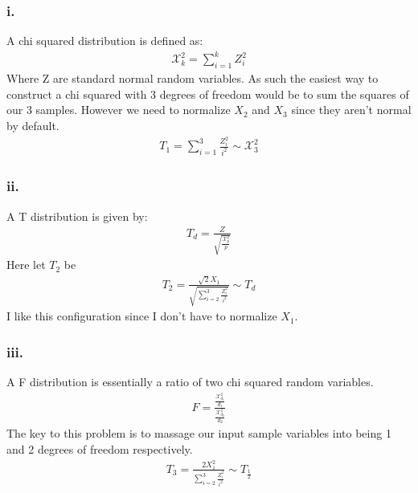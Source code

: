 \documentclass{article}
\begin{document}
\subsubsection*{i.}
A chi squared distribution is defined as:
\begin{align*}
\mathcal{X}^{2}_{k} = \sum_{i=1}^{k} Z^2_i
\end{align*}
Where Z are standard normal random variables. As such the easiest way to construct a chi squared with 3 degrees of freedom would be to sum the squares of our 3 samples. However we need to normalize $X_2$ and $X_3$ since they aren't normal by default.
\begin{align*}
\boxed{ T_1 = \sum_{i=1}^{3} \frac{Z^2_i}{i^2} \sim \mathcal{X}^{2}_{3} }
\end{align*}
\subsubsection*{ii.}
A T distribution is given by:
\begin{align*}
T_d = \frac{Z}{\sqrt{\tfrac{\mathcal{X}_p^2}{p}}}
\end{align*}
Here let $T_2$ be
\begin{align*}
\boxed{ T_2 = \frac{\sqrt{2}X_1}{\sqrt{\sum_{i=2}^{3}\tfrac{Z^2_i}{i^2}}} \sim T_d}
\end{align*}
I like this configuration since I don't have to normalize $X_1$.

\subsubsection*{iii.}
A F distribution is essentially a ratio of two chi squared random variables.
\begin{align*}
F = \frac{\tfrac{\mathcal{X}^2_{d_1}}{d_1}}{\tfrac{\mathcal{X}^2_{d_2}}{d_2}}
\end{align*}
The key to this problem is to massage our input sample variables into being 1 and 2 degrees of freedom respectively.
\begin{align*}
\boxed{ T_3 = \frac{2X_1^2}{\sum_{i=2}^{3}\tfrac{Z^2_i}{i^2}} \sim T_{\tfrac{1}{2}} }
\end{align*}
\end{document}
